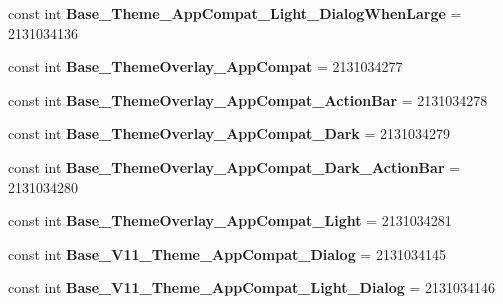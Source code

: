 \begin{DoxyCompactItemize}
\item 
\hypertarget{classClient_1_1Droid_1_1Resource_1_1Style_a193e4e81d3aba7a88779f3bd075d70d6}{}const int {\bfseries Base\+\_\+\+Theme\+\_\+\+App\+Compat\+\_\+\+Light\+\_\+\+Dialog\+When\+Large} = 2131034136\label{classClient_1_1Droid_1_1Resource_1_1Style_a193e4e81d3aba7a88779f3bd075d70d6}

\item 
\hypertarget{classClient_1_1Droid_1_1Resource_1_1Style_a665ffa80563f229f39fc66c80d1eebf5}{}const int {\bfseries Base\+\_\+\+Theme\+Overlay\+\_\+\+App\+Compat} = 2131034277\label{classClient_1_1Droid_1_1Resource_1_1Style_a665ffa80563f229f39fc66c80d1eebf5}

\item 
\hypertarget{classClient_1_1Droid_1_1Resource_1_1Style_a456033cb50bb00faf991556d26fbacf6}{}const int {\bfseries Base\+\_\+\+Theme\+Overlay\+\_\+\+App\+Compat\+\_\+\+Action\+Bar} = 2131034278\label{classClient_1_1Droid_1_1Resource_1_1Style_a456033cb50bb00faf991556d26fbacf6}

\item 
\hypertarget{classClient_1_1Droid_1_1Resource_1_1Style_a0bb9fa53cb48b44e3adf866d9bf735dc}{}const int {\bfseries Base\+\_\+\+Theme\+Overlay\+\_\+\+App\+Compat\+\_\+\+Dark} = 2131034279\label{classClient_1_1Droid_1_1Resource_1_1Style_a0bb9fa53cb48b44e3adf866d9bf735dc}

\item 
\hypertarget{classClient_1_1Droid_1_1Resource_1_1Style_a5a915cfd9413043710407a628a64fc49}{}const int {\bfseries Base\+\_\+\+Theme\+Overlay\+\_\+\+App\+Compat\+\_\+\+Dark\+\_\+\+Action\+Bar} = 2131034280\label{classClient_1_1Droid_1_1Resource_1_1Style_a5a915cfd9413043710407a628a64fc49}

\item 
\hypertarget{classClient_1_1Droid_1_1Resource_1_1Style_acf44d00323fb7df7fc925cc00631552c}{}const int {\bfseries Base\+\_\+\+Theme\+Overlay\+\_\+\+App\+Compat\+\_\+\+Light} = 2131034281\label{classClient_1_1Droid_1_1Resource_1_1Style_acf44d00323fb7df7fc925cc00631552c}

\item 
\hypertarget{classClient_1_1Droid_1_1Resource_1_1Style_ac6287f9f5c35df646a791f9d1b119f61}{}const int {\bfseries Base\+\_\+\+V11\+\_\+\+Theme\+\_\+\+App\+Compat\+\_\+\+Dialog} = 2131034145\label{classClient_1_1Droid_1_1Resource_1_1Style_ac6287f9f5c35df646a791f9d1b119f61}

\item 
\hypertarget{classClient_1_1Droid_1_1Resource_1_1Style_a77844e7a18bdf4618564b5b1d8a726a1}{}const int {\bfseries Base\+\_\+\+V11\+\_\+\+Theme\+\_\+\+App\+Compat\+\_\+\+Light\+\_\+\+Dialog} = 2131034146\label{classClient_1_1Droid_1_1Resource_1_1Style_a77844e7a18bdf4618564b5b1d8a726a1}


\end{DoxyCompactItemize}
